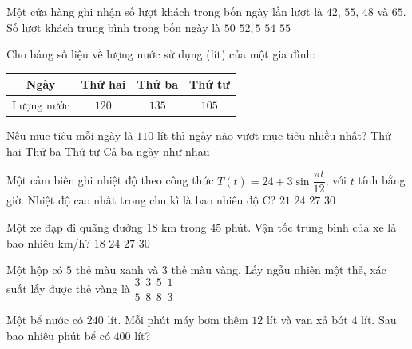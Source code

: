 
\begin{ex}
Một cửa hàng ghi nhận số lượt khách trong bốn ngày lần lượt là $42$, $55$, $48$ và $65$. Số lượt khách trung bình trong bốn ngày là
\choice
{$50$}
{\True $52{,}5$}
{$54$}
{$55$}
\end{ex}

\begin{ex}
Cho bảng số liệu về lượng nước sử dụng (lít) của một gia đình:
\begin{center}
\begin{tabular}{|c|c|c|c|}
\hline
Ngày & Thứ hai & Thứ ba & Thứ tư \\ \hline
Lượng nước & $120$ & $135$ & $105$ \\ \hline
\end{tabular}
\end{center}
Nếu mục tiêu mỗi ngày là $110$ lít thì ngày nào vượt mục tiêu nhiều nhất?
\choice
{Thứ hai}
{\True Thứ ba}
{Thứ tư}
{Cả ba ngày như nhau}
\end{ex}

\begin{ex}
Một cảm biến ghi nhiệt độ theo công thức $T(t)=24+3\sin\dfrac{\pi t}{12}$, với $t$ tính bằng giờ. Nhiệt độ cao nhất trong chu kì là bao nhiêu độ C?
\choice
{$21$}
{$24$}
{\True $27$}
{$30$}
\end{ex}

\begin{ex}
Một xe đạp đi quãng đường $18$ km trong $45$ phút. Vận tốc trung bình của xe là bao nhiêu km/h?
\choice
{$18$}
{\True $24$}
{$27$}
{$30$}
\end{ex}

\begin{ex}
Một hộp có $5$ thẻ màu xanh và $3$ thẻ màu vàng. Lấy ngẫu nhiên một thẻ, xác suất lấy được thẻ vàng là
\choice
{$\dfrac{3}{5}$}
{\True $\dfrac{3}{8}$}
{$\dfrac{5}{8}$}
{$\dfrac{1}{3}$}
\end{ex}

\begin{ex}
Một bể nước có $240$ lít. Mỗi phút máy bơm thêm $12$ lít và van xả bớt $4$ lít. Sau bao nhiêu phút bể có $400$ lít?
\end{ex}

